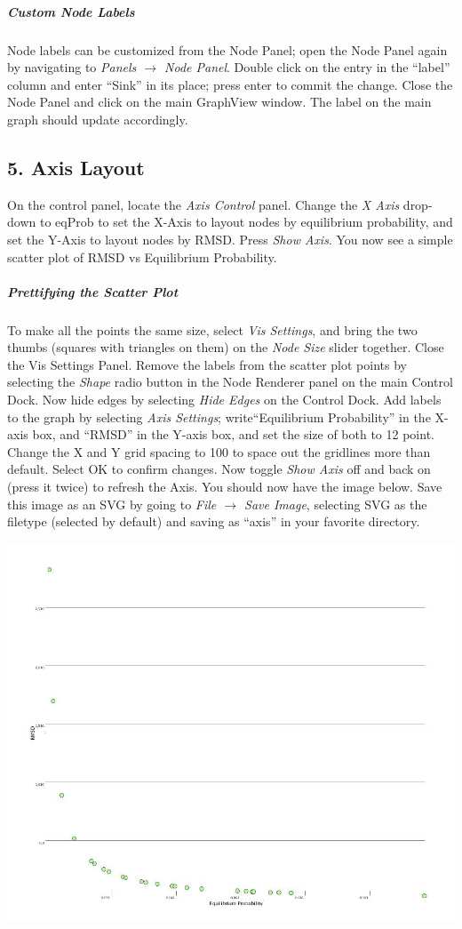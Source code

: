 \documentclass[10pt,a4paper]{report}
\begin{document}
\subparagraph*{Custom Node Labels}
Node labels can be customized from the Node Panel; open the Node Panel again by navigating to \emph{Panels $\rightarrow$ Node Panel}. Double click on the entry in the ``label'' column and enter ``Sink'' in its place; press enter to commit the change. Close the Node Panel and click on the main GraphView window. The label on the main graph should update accordingly. 

\subsection*{5. Axis Layout}
On the control panel, locate the \emph{Axis Control} panel. Change the \emph{X Axis} drop-down to eqProb to set the X-Axis to layout nodes by equilibrium probability, and set the Y-Axis to layout nodes by RMSD. Press \emph{Show Axis}. You now see a simple scatter plot of RMSD vs Equilibrium Probability. 

\subparagraph*{Prettifying the Scatter Plot}
To make all the points the same size, select \emph{Vis Settings}, and bring the two thumbs (squares with triangles on them) on the \emph{Node Size} slider together. Close the Vis Settings Panel. Remove the labels from the scatter plot points by selecting the \emph{Shape} radio button in the Node Renderer panel on the main Control Dock. Now hide edges by selecting \emph{Hide Edges} on the Control Dock. Add labels to the graph by selecting \emph{Axis Settings}; write``Equilibrium Probability'' in the X-axis box, and ``RMSD'' in the Y-axis box, and set the size of both to 12 point. Change the X and Y grid spacing to 100 to space out the gridlines more than default. Select OK to confirm changes. Now toggle \emph{Show Axis} off and back on (press it twice) to refresh the Axis. You should now have the image below. Save this image as an SVG by going to \emph{File $\rightarrow$ Save Image}, selecting SVG as the filetype (selected by default) and saving as ``axis'' in your favorite directory.

\begin{center}
\includegraphics[scale=.3]{tut0.jpg}
\end{center}
\end{document}

